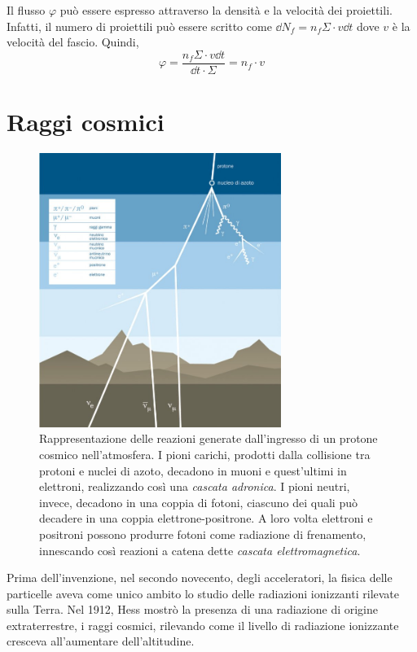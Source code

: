 \documentclass[../main.tex]{subfiles}
\begin{document}
Il flusso $\varphi$ può essere espresso attraverso la densità e la velocità dei proiettili. Infatti, il numero di proiettili può essere scritto come $\dd N_f = n_f \Sigma \cdot v \dd t$ dove $v$ è la velocità del fascio. Quindi, 
\begin{equation}
    \varphi = \frac{n_f \Sigma \cdot v \dd t}{\dd t \cdot \Sigma} = n_f \cdot v
\end{equation}

\section{Raggi cosmici}
\begin{figure}[b!]
    \centering
    \includegraphics[width=0.7\textwidth]{cosmic.jpg}
    \caption{Rappresentazione delle reazioni generate dall'ingresso di un protone cosmico nell'atmosfera. I pioni carichi, prodotti dalla collisione tra protoni e nuclei di azoto, decadono in muoni e quest'ultimi in elettroni, realizzando così una \textit{cascata adronica}. I pioni neutri, invece, decadono in una coppia di fotoni, ciascuno dei quali può decadere in una coppia elettrone-positrone. A loro volta elettroni e positroni possono produrre fotoni come radiazione di frenamento, innescando così reazioni a catena dette \textit{cascata elettromagnetica}. \cite{as10_vdu}}
    \label{fig:cosmic}
\end{figure}
Prima dell'invenzione, nel secondo novecento, degli acceleratori, la fisica delle particelle aveva come unico ambito lo studio delle radiazioni ionizzanti rilevate sulla Terra.
Nel 1912, Hess mostrò la presenza di una radiazione di origine extraterrestre, i raggi cosmici, rilevando come il livello di radiazione ionizzante cresceva all'aumentare dell'altitudine.
\end{document}
